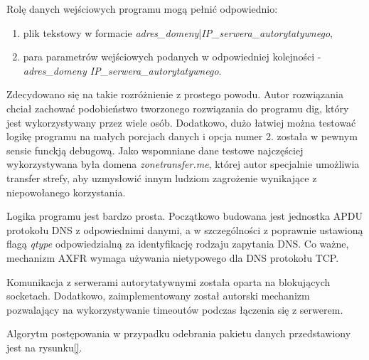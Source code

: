 Rolę danych wejściowych programu mogą pełnić odpowiednio:
\begin{enumerate}
	\item plik tekstowy w formacie \textit{adres\_domeny}|\textit{IP\_serwera\_autorytatywnego},
	\item para parametrów wejściowych podanych w odpowiedniej kolejności - \textit{adres\_domeny IP\_serwera\_autorytatywnego}. 
\end{enumerate}
Zdecydowano się na takie rozróżnienie z prostego powodu. Autor rozwiązania chciał zachować podobieństwo tworzonego rozwiązania do programu dig, który jest wykorzystywany przez wiele osób. Dodatkowo, dużo łatwiej można testować logikę programu na małych porcjach danych i opcja numer 2. została w pewnym sensie funckją debugową. Jako wspomniane dane testowe najczęściej wykorzystywana była domena \textit{zonetransfer.me}\cite{zonetransfer}, której autor specjalnie umożliwia transfer strefy, aby uzmysłowić innym ludziom zagrożenie wynikające z niepowołanego korzystania.

Logika programu jest bardzo prosta. Początkowo budowana jest jednostka APDU protokołu DNS z odpowiednimi danymi, a w szczególności z poprawnie ustawioną flagą \textit{qtype} odpowiedzialną za identyfikację rodzaju zapytania DNS. Co ważne, mechanizm AXFR wymaga używania nietypowego dla DNS protokołu TCP.

Komunikacja z serwerami autorytatywnymi została oparta na blokujących socketach. Dodatkowo, zaimplementowany został autorski mechanizm pozwalający na wykorzystywanie timeoutów podczas łączenia się z serwerem. 

Algorytm postępowania w przypadku odebrania pakietu danych przedstawiony jest na rysunku\ref{}.